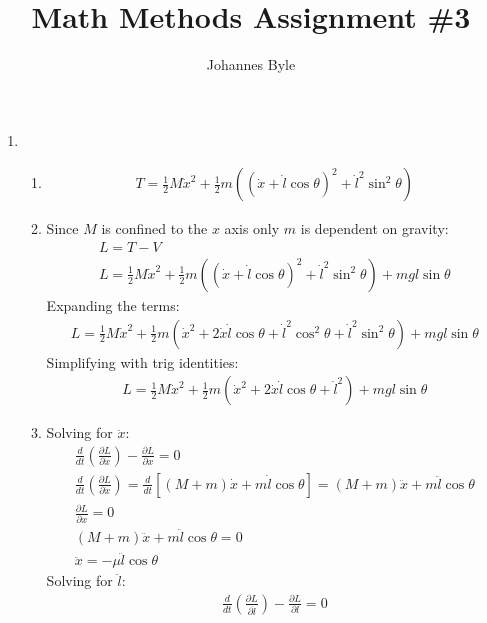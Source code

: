 \documentclass[12pt]{article}
\title{Math Methods Assignment \#3}
\author{Johannes Byle}
\newcommand{\p}[2]{\frac{\partial #1}{\partial #2}}
\newcommand{\der}[2]{\frac{d #1}{d #2}}
\begin{document}
    \maketitle
    \begin{enumerate}
        \item
        \begin{enumerate}
            \item
            \begin{gather}
                T=\frac{1}{2}M\dot{x}^2+\frac{1}{2}m((\dot{x}+\dot{l}\cos\theta)^2+\dot{l}^2\sin^2\theta)
            \end{gather}
            \item
            Since $M$ is confined to the $x$ axis only $m$ is dependent on gravity:
            \begin{gather}
                L=T-V\\
                L=\frac{1}{2}M\dot{x}^2+\frac{1}{2}m((\dot{x}+\dot{l}\cos\theta)^2+\dot{l}^2\sin^2\theta)+mgl\sin\theta
            \end{gather}
            Expanding the terms:
            \begin{gather}
                L=\frac{1}{2}M\dot{x}^2+\frac{1}{2}m(\dot{x}^2+2\dot{x}\dot{l}\cos\theta+\dot{l}^2\cos^2\theta+\dot{l}^2\sin^2\theta)+mgl\sin\theta
            \end{gather}
            Simplifying with trig identities:
            \begin{gather}
                L=\frac{1}{2}M\dot{x}^2+\frac{1}{2}m(\dot{x}^2+2\dot{x}\dot{l}\cos\theta+\dot{l}^2)+mgl\sin\theta
            \end{gather}
            \item
            Solving for $\ddot{x}$:
            \begin{gather}
                \der{}{t}\left(\p{L}{\dot{x}}\right)-\p{L}{x}=0\\
                \der{}{t}\left(\p{L}{\dot{x}}\right)=\der{}{t}\left[(M+m)\dot{x}+m\dot{l}\cos\theta\right]=(M+m)\ddot{x}+m\ddot{l}\cos\theta\\
                \p{L}{x}=0\\
                (M+m)\ddot{x}+m\ddot{l}\cos\theta=0\\
                \ddot{x}=-\mu\ddot{l}\cos\theta
            \end{gather}
            Solving for $\ddot{l}$:
            \begin{gather}
                \der{}{t}\left(\p{L}{\dot{l}}\right)-\p{L}{l}=0\\

\end{gather}
\end{enumerate}
\end{enumerate}
\end{document}
